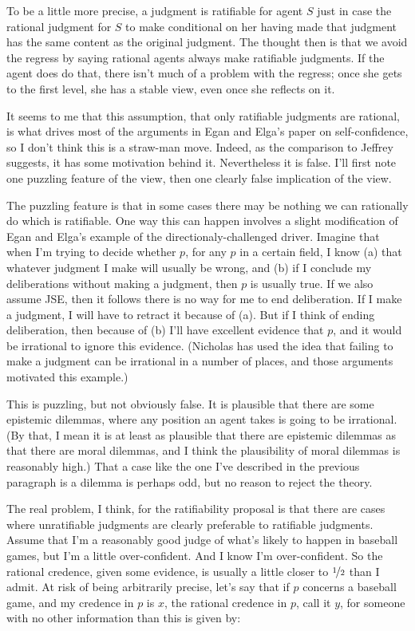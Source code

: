 To be a little more precise, a judgment is ratifiable for agent \(S\) just in case the rational judgment for \(S\) to make conditional on her having made that judgment has the same content as the original judgment. The thought then is that we avoid the regress by saying rational agents always make ratifiable judgments. If the agent does do that, there isn't much of a problem with the regress; once she gets to the first level, she has a stable view, even once she reflects on it. 

It seems to me that this assumption, that only ratifiable judgments are rational, is what drives most of the arguments in Egan and Elga's paper on self-confidence, so I don't think this is a straw-man move. Indeed, as the comparison to Jeffrey suggests, it has some motivation behind it. Nevertheless it is false. I'll first note one puzzling feature of the view, then one clearly false implication of the view.

The puzzling feature is that in some cases there may be nothing we can rationally do which is ratifiable. One way this can happen involves a slight modification of Egan and Elga's example of the directionaly-challenged driver. Imagine that when I'm trying to decide whether \(p\), for any \(p\) in a certain field, I know (a) that whatever judgment I make will usually be wrong, and (b) if I conclude my deliberations without making a judgment, then \(p\) is usually true. If we also assume JSE, then it follows there is no way for me to end deliberation. If I make a judgment, I will have to retract it because of (a). But if I think of ending deliberation, then because of (b) I'll have excellent evidence that \(p\), and it would be irrational to ignore this evidence. (Nicholas \citet{Silins2005} has used the idea that failing to make a judgment can be irrational in a number of places, and those arguments motivated this example.)

This is puzzling, but not obviously false. It is plausible that there are some epistemic dilemmas, where any position an agent takes is going to be irrational. (By that, I mean it is at least as plausible that there are epistemic dilemmas as that there are moral dilemmas, and I think the plausibility of moral dilemmas is reasonably high.) That a case like the one I've described in the previous paragraph is a dilemma is perhaps odd, but no reason to reject the theory.

The real problem, I think, for the ratifiability proposal is that there are cases where unratifiable judgments are clearly preferable to ratifiable judgments. Assume that I'm a reasonably good judge of what's likely to happen in baseball games, but I'm a little over-confident. And I know I'm over-confident. So the rational credence, given some evidence, is usually a little closer to \(\nicefrac{1}{2}\) than I admit. At risk of being arbitrarily precise, let's say that if \(p\) concerns a baseball game, and my credence in \(p\) is \(x\), the rational credence in \(p\), call it \(y\), for someone with no other information than this is given by:

